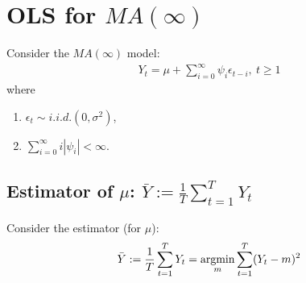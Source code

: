 \documentclass[11pt]{elegantbook}
\newcommand{\argmin}{\operatornamewithlimits{argmin}}
\begin{document}
\section{OLS for $MA(\infty)$}
Consider the $MA(\infty)$ model:
\begin{equation}
    \begin{aligned}
        Y_t=\mu+\sum_{i=0}^\infty \psi_i\epsilon_{t-i},\ t\geq 1
    \end{aligned}
    \nonumber
\end{equation}
where
\begin{enumerate}
    \item $\epsilon_t\sim i.i.d.(0,\sigma^2)$,
    \item $\sum_{i=0}^\infty i|\psi_i|<\infty$.
\end{enumerate}

\subsection{Estimator of $\mu$: $\bar{Y}:=\frac{1}{T}\sum_{t=1}^T Y_t$}
Consider the estimator (for $\mu$):
\begin{equation}
    \begin{aligned}
        \bar{Y}:=\frac{1}{T}\sum_{t=1}^T Y_t=\argmin_m\sum_{t=1}^T (Y_t-m)^2
    \end{aligned}
    \nonumber
\end{equation}
\end{document}
